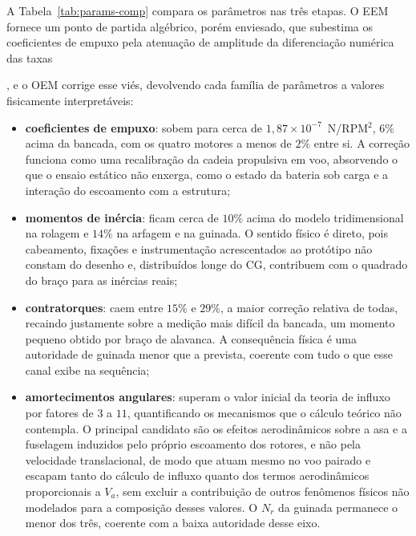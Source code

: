 A Tabela~\ref{tab:params-comp} compara os parâmetros nas três etapas. O EEM fornece um ponto de partida algébrico, porém enviesado, que subestima os coeficientes de empuxo pela atenuação de amplitude da diferenciação numérica das taxas{\color{blue}, e o OEM corrige esse viés, devolvendo cada família de parâmetros a valores fisicamente interpretáveis:
\begin{itemize}
    \item \textbf{coeficientes de empuxo}: sobem para cerca de $1{,}87\times10^{-7}$~N/RPM$^2$, $6\%$ acima da bancada, com os quatro motores a menos de $2\%$ entre si. A correção funciona como uma recalibração da cadeia propulsiva em voo, absorvendo o que o ensaio estático não enxerga, como o estado da bateria sob carga e a interação do escoamento com a estrutura;
    \item \textbf{momentos de inércia}: ficam cerca de $10\%$ acima do modelo tridimensional na rolagem e $14\%$ na arfagem e na guinada. O sentido físico é direto, pois cabeamento, fixações e instrumentação acrescentados ao protótipo não constam do desenho e, distribuídos longe do CG, contribuem com o quadrado do braço para as inércias reais;
    \item \textbf{contratorques}: caem entre $15\%$ e $29\%$, a maior correção relativa de todas, recaindo justamente sobre a medição mais difícil da bancada, um momento pequeno obtido por braço de alavanca. A consequência física é uma autoridade de guinada menor que a prevista, coerente com tudo o que esse canal exibe na sequência;
    \item \textbf{amortecimentos angulares}: superam o valor inicial da teoria de influxo por fatores de $3$ a $11$, quantificando os mecanismos que o cálculo teórico não contempla. O principal candidato são os efeitos aerodinâmicos sobre a asa e a fuselagem induzidos pelo próprio escoamento dos rotores, e não pela velocidade translacional, de modo que atuam mesmo no voo pairado e escapam tanto do cálculo de influxo quanto dos termos aerodinâmicos proporcionais a $V_a$, sem excluir a contribuição de outros fenômenos físicos não modelados para a composição desses valores. O $N_r$ da guinada permanece o menor dos três, coerente com a baixa autoridade desse eixo.
\end{itemize}}

